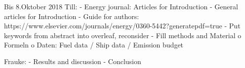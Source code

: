 Bis 8.Oktober 2018
Till:
-	Energy journal: Articles for Introduction
-	General articles for Introduction
-	Guide for authors: https://www.elsevier.com/journals/energy/0360-5442?generatepdf=true
-	Put keywords from abstract into overleaf, reconsider
-	Fill methods and Material
o	Formeln
o	Daten: Fuel data / Ship data / Emission budget

Frauke:
-	Results and discussion
-	Conclusion
